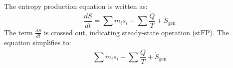 The entropy production equation is written as:  
\[
\frac{dS}{dt} = \sum \dot{m}_i s_i + \sum \frac{\dot{Q}}{T} + \dot{S}_{\text{gen}}
\]  
The term \( \frac{dS}{dt} \) is crossed out, indicating steady-state operation (\( \text{stFP} \)). The equation simplifies to:  
\[
\sum \dot{m}_i s_i + \sum \frac{\dot{Q}}{T} + \dot{S}_{\text{gen}}
\]